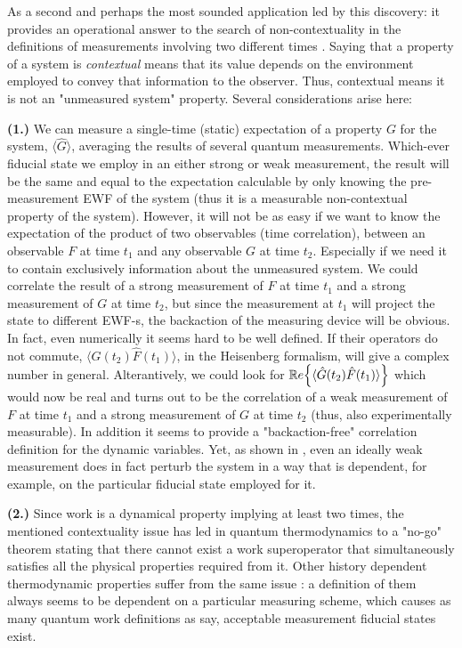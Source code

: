 \documentclass[11pt, a4paper]{article} %
\begin{document}
As a second and perhaps the most sounded application led by this discovery: it provides an operational answer to the search of non-contextuality in the definitions of measurements involving two different times \cite{DevInPosition1}. Saying that a property of a system is {\em contextual} means that its value depends on the environment employed to convey that information to the observer. Thus, contextual means it is not an "unmeasured system" property. Several considerations arise here:\vspace{-0.1cm}

{\bf (1.)} We can measure a single-time (static) expectation of a property $G$ for the system, $\langle \hat{G}\rangle$, averaging the results of several quantum measurements. Which-ever fiducial state we employ in an either strong or weak measurement, the result will be the same and equal to the expectation calculable by only knowing the pre-measurement EWF of the system (thus it is a measurable non-contextual property of the system). However, it will not be as easy if we want to know the expectation of the product of two observables (time correlation), between an observable $F$ at time $t_1$ and any observable $G$ at time $t_2$. Especially if we need it to contain exclusively information about the unmeasured system. We could correlate the result of a strong measurement of $F$ at time $t_1$ and a strong measurement of $G$ at time $t_2$, but since the measurement at $t_1$ will project the state to different EWF-s, the backaction of the measuring device will be obvious. In fact, even numerically it seems hard to be well defined. If their operators do not commute, $\langle \hat{G}(t_2)\hat{F}(t_1)\rangle$, in the Heisenberg formalism, will give a complex number in general. Alterantively, we could look for $\mathbb{R}e \qty{\langle \hat{G}(t_2)\hat{F}(t_1)\rangle}$ which would now be real and turns out to be the correlation of a weak measurement of $F$ at time $t_1$ and a strong measurement of $G$ at time $t_2$ (thus, also experimentally measurable). In addition it seems to provide a "backaction-free" correlation definition for the dynamic variables. Yet, as shown in \cite{spin}, even an ideally weak measurement does in fact perturb the system in a way that is dependent, for example, on the particular fiducial state employed for it.\vspace{-0.05cm}

{\bf (2.)} Since work is a dynamical property implying at least two times, the mentioned contextuality issue has led in quantum thermodynamics to a "no-go" theorem \cite{nogo} stating that there cannot exist a work superoperator that simultaneously satisfies all the physical properties required from it. Other history dependent thermodynamic properties suffer from the same issue \cite{workPb1, workPb2}: a definition of them always seems to be dependent on a particular measuring scheme, which causes as many quantum work definitions as say, acceptable measurement fiducial states exist.
\end{document}
